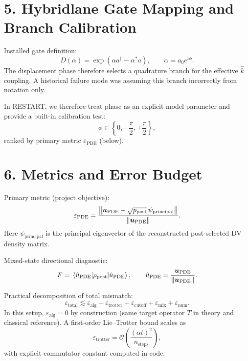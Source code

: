 \documentclass[11pt]{article}
\begin{document}
\section*{5. Hybridlane Gate Mapping and Branch Calibration}
Installed gate definition:
\begin{equation}
D(\alpha)=\exp(\alpha a^\dagger-\alpha^*a),\qquad \alpha=a_0e^{i\phi}.
\end{equation}
The displacement phase therefore selects a quadrature branch for the effective $\hat{k}$ coupling.
A historical failure mode was assuming this branch incorrectly from notation only.

In RESTART, we therefore treat phase as an explicit model parameter and provide a built-in calibration test:
\begin{equation}
\phi\in\left\{0,-\frac\pi2,+\frac\pi2\right\},
\end{equation}
ranked by primary metric $\varepsilon_{\mathrm{PDE}}$ (below).

\section*{6. Metrics and Error Budget}
Primary metric (project objective):
\begin{equation}
\varepsilon_{\mathrm{PDE}}=
\frac{\norm{\bm u_{\mathrm{PDE}}-\sqrt{p_{\mathrm{post}}}\,\psi_{\mathrm{principal}}}}{\norm{\bm u_{\mathrm{PDE}}}}.
\end{equation}
Here $\psi_{\mathrm{principal}}$ is the principal eigenvector of the reconstructed post-selected DV density matrix.

Mixed-state directional diagnostic:
\begin{equation}
F=\mel{\hat u_{\mathrm{PDE}}}{\rho_{\mathrm{post}}}{\hat u_{\mathrm{PDE}}},
\qquad \hat u_{\mathrm{PDE}}=\frac{\bm u_{\mathrm{PDE}}}{\norm{\bm u_{\mathrm{PDE}}}}.
\end{equation}

Practical decomposition of total mismatch:
\begin{equation}
\varepsilon_{\mathrm{total}}\lesssim
\varepsilon_{\mathrm{alg}}+\varepsilon_{\mathrm{trotter}}+\varepsilon_{\mathrm{cutoff}}+\varepsilon_{\mathrm{mix}}+\varepsilon_{\mathrm{num}}.
\end{equation}
In this setup, $\varepsilon_{\mathrm{alg}}=0$ by construction (same target operator $T$ in theory and classical reference).
A first-order Lie--Trotter bound scales as
\begin{equation}
\varepsilon_{\mathrm{trotter}}=\mathcal O\!\left(\frac{(\alpha t)^2}{n_{\text{steps}}}\right),
\end{equation}
with explicit commutator constant computed in code.
\end{document}
